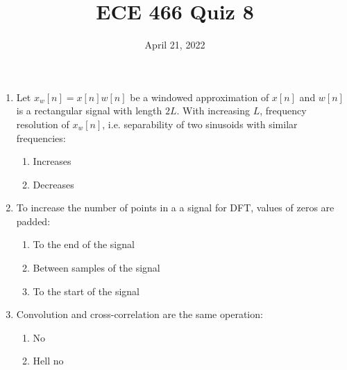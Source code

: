 \documentclass{article}
\date{April 21, 2022}
\begin{document}
 
\title{ECE 466 Quiz 8}
 
\maketitle
 
\begin{enumerate}
    \item Let $x_w[n]=x[n]w[n]$ be a windowed approximation of $x[n]$ and $w[n]$ is a rectangular signal with length $2L$. With increasing $L$, frequency resolution of $x_w[n]$, i.e. separability of two sinusoids with similar frequencies:
    \begin{enumerate}
        \item Increases
        \item Decreases
    \end{enumerate}

    \item To increase the number of points in a a signal for DFT, values of zeros are padded:
    \begin{enumerate}
        \item To the end of the signal
        \item Between samples of the signal
        \item To the start of the signal
    \end{enumerate}

    \item Convolution and cross-correlation are the same operation:
    \begin{enumerate}
        \item No
        \item Hell no
    \end{enumerate}
\end{enumerate}
\end{document}
